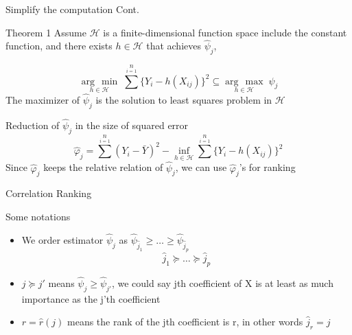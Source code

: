 \documentclass[ignorenonframetext,]{beamer}
\newcommand{\argmax}[1]{\underset{#1}{\operatorname{arg}\,\operatorname{max}}\;}
\newcommand{\argmin}[1]{\underset{#1}{\operatorname{arg}\,\operatorname{min}}\;}
\begin{document}
\begin{frame}{Simplify the computation Cont.}

\begin{block}{Theorem 1}
Assume $\mathcal{H}$ is a finite-dimensional function space include the constant function, and there exists $ h\in\mathcal{H}$ that achieves $\hat{\psi}_j$,

\[
\argmin{h \in \mathcal{H}} \sum^n\limits_{i = 1}\{Y_i - h(X_{ij})\}^2 \subseteq \argmax{h \in \mathcal{H}} \hat{\psi}_j
\]
The maximizer of $\hat{\psi}_j$ is the solution to least squares problem in $\mathcal{H}$
\end{block}

\begin{block}{Reduction of $\hat{\psi}_j$ in the size of squared error}
\[
  \hat{\varphi}_j = \sum^n\limits_{i = 1} (Y_i - \bar{Y})^2 - \inf\limits_{h \in \mathcal{H}}\sum^n\limits_{i = 1}\{Y_i - h(X_{ij})\}^2
\]
Since $\hat{\varphi}_j$ keeps the relative relation of $\hat{\psi}_j$, we can use $\hat{\varphi}_j$'s for ranking
\end{block}

\end{frame}

\begin{frame}{Correlation Ranking}

\begin{block}{Some notations}

\begin{itemize}
\item
  We order estimator \(\hat{\psi}_j\) as
  \(\hat{\psi}_{\hat{j}_1} \geq \dots \geq \hat{\psi}_{\hat{j}_p}\) \[
    \hat{j}_1 \succeq \dots \succeq \hat{j}_p
  \]
\item
  \(j \succeq j'\) means \(\hat{\psi}_j \geq \hat{\psi}_{j'}\), we could
  say jth coefficient of X is at least as much importance as the j'th
  coefficient
\item
  \(r = \hat{r}(j)\) means the rank of the jth coefficient is r, in
  other words \(\hat{j}_r = j\)
\end{itemize}

\end{block}

\end{frame}
\end{document}

